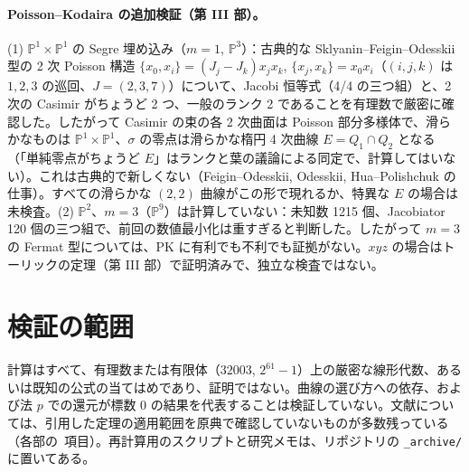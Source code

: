 \paragraph{Poisson--Kodaira の追加検証（第 III 部）。}(1) $\mathbb P^1\times\mathbb P^1$ の Segre 埋め込み（$m=1$, $\mathbb P^3$）：古典的な Sklyanin--Feigin--Odesskii 型の 2 次 Poisson 構造 $\{x_0,x_i\}=(J_j-J_k)x_jx_k$, $\{x_j,x_k\}=x_0x_i$（$(i,j,k)$ は $1,2,3$ の巡回、$J=(2,3,7)$）について、Jacobi 恒等式（4/4 の三つ組）と、2 次の Casimir がちょうど 2 つ、一般のランク 2 であることを有理数で厳密に確認した\tV。したがって Casimir の束の各 2 次曲面は Poisson 部分多様体で、滑らかなものは $\mathbb P^1\times\mathbb P^1$、$\sigma$ の零点は滑らかな楕円 4 次曲線 $E=Q_1\cap Q_2$ となる（「単純零点がちょうど $E$」はランクと葉の議論による同定で、計算してはいない）。これは古典的で新しくない（Feigin--Odesskii, Odesskii, Hua--Polishchuk の仕事\tQ）。すべての滑らかな $(2,2)$ 曲線がこの形で現れるか、特異な $E$ の場合は未検査\tK。(2) $\mathbb P^2$、$m=3$（$\mathbb P^9$）は計算していない：未知数 1215 個、Jacobiator 120 個の三つ組で、前回の数値最小化は重すぎると判断した。したがって $m=3$ の Fermat 型については、PK に有利でも不利でも証拠がない。$xyz$ の場合はトーリックの定理（第 III 部）で証明済みで、独立な検査ではない。

\section{検証の範囲}
計算はすべて、有理数または有限体（$32003$, $2^{61}-1$）上の厳密な線形代数、あるいは既知の公式の当てはめであり、証明ではない。曲線の選び方への依存、および法 $p$ での還元が標数 0 の結果を代表することは検証していない。文献については、引用した定理の適用範囲を原典で確認していないものが多数残っている（各部の\tQ\ 項目）。再計算用のスクリプトと研究メモは、リポジトリの \texttt{\_archive/} に置いてある。
